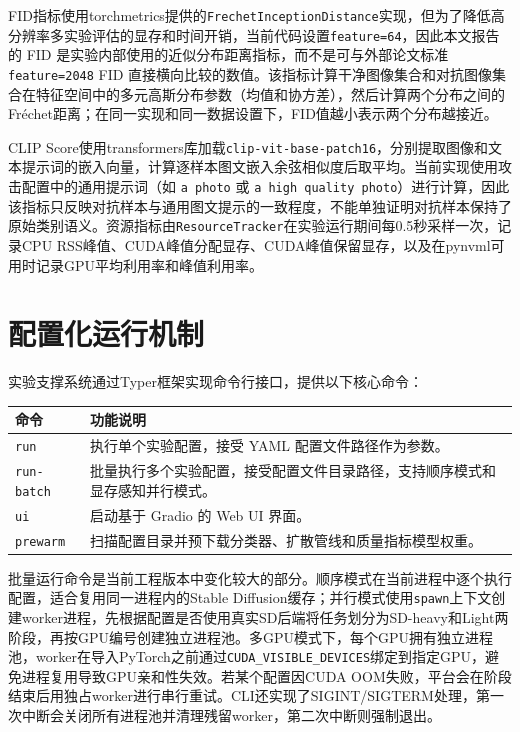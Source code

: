 \documentclass[type=bachelor,oneside]{fduthesis}
\newcommand{\tablefont}{\small}
\begin{document}
FID指标使用torchmetrics提供的\texttt{FrechetInceptionDistance}实现，但为了降低高分辨率多实验评估的显存和时间开销，当前代码设置\texttt{feature=64}，因此本文报告的 FID 是实验内部使用的近似分布距离指标，而不是可与外部论文标准 \texttt{feature=2048} FID 直接横向比较的数值。该指标计算干净图像集合和对抗图像集合在特征空间中的多元高斯分布参数（均值和协方差），然后计算两个分布之间的Fréchet距离；在同一实现和同一数据设置下，FID值越小表示两个分布越接近。

CLIP Score使用transformers库加载\texttt{clip-vit-base-patch16}，分别提取图像和文本提示词的嵌入向量，计算逐样本图文嵌入余弦相似度后取平均。当前实现使用攻击配置中的通用提示词（如 \texttt{a photo} 或 \texttt{a high quality photo}）进行计算，因此该指标只反映对抗样本与通用图文提示的一致程度，不能单独证明对抗样本保持了原始类别语义。资源指标由\texttt{ResourceTracker}在实验运行期间每0.5秒采样一次，记录CPU RSS峰值、CUDA峰值分配显存、CUDA峰值保留显存，以及在pynvml可用时记录GPU平均利用率和峰值利用率。

\section{配置化运行机制}

实验支撑系统通过Typer框架实现命令行接口，提供以下核心命令：

\begin{table}[htbp]
  \centering
  \tablefont
  \setlength{\tabcolsep}{5pt}
  \begin{tabularx}{0.95\textwidth}{lX}
    \toprule
    命令 & 功能说明 \\
    \midrule
    \texttt{run} & 执行单个实验配置，接受 YAML 配置文件路径作为参数。 \\
    \texttt{run-batch} & 批量执行多个实验配置，接受配置文件目录路径，支持顺序模式和显存感知并行模式。 \\
    \texttt{ui} & 启动基于 Gradio 的 Web UI 界面。 \\
    \texttt{prewarm} & 扫描配置目录并预下载分类器、扩散管线和质量指标模型权重。 \\
    \bottomrule
  \end{tabularx}
\end{table}

批量运行命令是当前工程版本中变化较大的部分。顺序模式在当前进程中逐个执行配置，适合复用同一进程内的Stable Diffusion缓存；并行模式使用\texttt{spawn}上下文创建worker进程，先根据配置是否使用真实SD后端将任务划分为SD-heavy和Light两阶段，再按GPU编号创建独立进程池。多GPU模式下，每个GPU拥有独立进程池，worker在导入PyTorch之前通过\texttt{CUDA\_VISIBLE\_DEVICES}绑定到指定GPU，避免进程复用导致GPU亲和性失效。若某个配置因CUDA OOM失败，平台会在阶段结束后用独占worker进行串行重试。CLI还实现了SIGINT/SIGTERM处理，第一次中断会关闭所有进程池并清理残留worker，第二次中断则强制退出。
\end{document}
